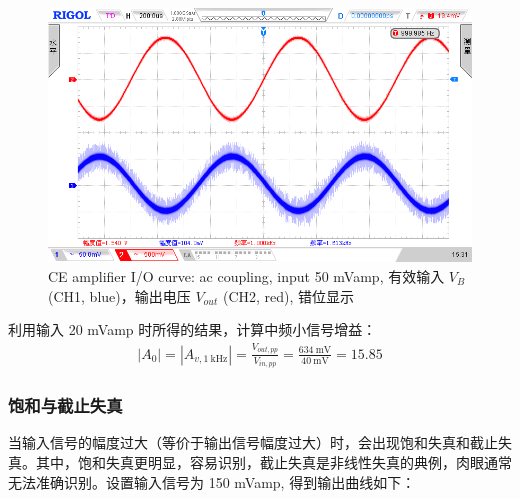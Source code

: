 \documentclass[UTF8]{article}
\begin{document}
\begin{figure}[H]\centering
    \includegraphics[width=\columnwidth]{LCE-02-三极管/assets/CE input 50mVamp (R_S = 0), 正常线性放大 错位显示.png}
    \caption{CE amplifier I/O curve: ac coupling, input 50 mVamp, 有效输入 $V_{B}$ (CH1, blue)，输出电压 $V_{out}$ (CH2, red), 错位显示}
\end{figure}



利用输入 20 mVamp 时所得的结果，计算中频小信号增益：
\begin{gather}
|A_0| = |A_{v, 1\ \mathrm{kHz}}| = \frac{V_{out,pp}}{V_{in,pp}} = \frac{634 \ \mathrm{mV}}{40 \ \mathrm{mV}} = 15.85 
\end{gather}


\subsubsection{饱和与截止失真}

当输入信号的幅度过大（等价于输出信号幅度过大）时，会出现饱和失真和截止失真。其中，饱和失真更明显，容易识别，截止失真是非线性失真的典例，肉眼通常无法准确识别。设置输入信号为 150 mVamp, 得到输出曲线如下：
\end{document}

